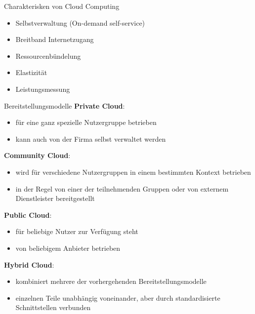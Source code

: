 \begin{bonus}{Charakterisken von Cloud Computing}
    \begin{itemize}
        \item Selbstverwaltung (On-demand self-service)
        \item Breitband Internetzugang
        \item Ressourcenbündelung
        \item Elastizität
        \item Leistungsmessung
    \end{itemize}
\end{bonus}

\begin{defi}{Bereitstellungsmodelle}
    \textbf{Private Cloud}:
    \begin{itemize}
        \item für eine ganz spezielle Nutzergruppe betrieben
        \item kann auch von der Firma selbst verwaltet werden
    \end{itemize}

    \textbf{Community Cloud}:
    \begin{itemize}
        \item wird für verschiedene Nutzergruppen in einem bestimmten Kontext betrieben
        \item in der Regel von einer der teilnehmenden Gruppen oder von externem Dienstleister bereitgestellt
    \end{itemize}

    \textbf{Public Cloud}:
    \begin{itemize}
        \item für beliebige Nutzer zur Verfügung steht
        \item von beliebigem Anbieter betrieben
    \end{itemize}

    \textbf{Hybrid Cloud}:
    \begin{itemize}
        \item kombiniert mehrere der vorhergehenden Bereitstellungsmodelle
        \item einzelnen Teile unabhängig voneinander, aber durch standardisierte Schnittstellen verbunden
    \end{itemize}
\end{defi}
